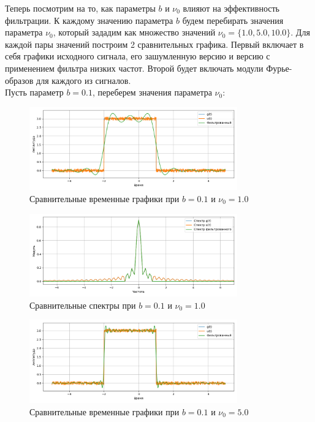 \documentclass[a4paper]{article}
\begin{document}
Теперь посмотрим на то, как параметры $b$ и $\nu_0$ влияют на эффективность фильтрации. К каждому значению параметра $b$ будем перебирать значения параметра $\nu_0$, который зададим как множество значений $\nu_0 = \{1.0, 5.0, 10.0\}$. Для каждой пары значений построим 2 сравнительных графика. Первый включает в себя графики исходного сигнала, его зашумленную версию и версию с применением фильтра низких частот. Второй будет включать модули Фурье-образов для каждого из сигналов.\\ [0.5em]
Пусть параметр $b=0.1$, переберем значения параметра $\nu_0$:
\begin{figure}[H]
    \centering
    \includegraphics[width=0.8\textwidth]{src/lpf/time_0.1_1.0.png}
    \caption{Сравнительные временные графики при $b=0.1$ и $\nu_0=1.0$}
\end{figure}
\begin{figure}[H]
    \centering
    \includegraphics[width=0.8\textwidth]{src/lpf/spec_0.1_1.0.png}
    \caption{Сравнительные спектры при $b=0.1$ и $\nu_0=1.0$}
\end{figure}
\begin{figure}[H]
    \centering
    \includegraphics[width=0.8\textwidth]{src/lpf/time_0.1_5.0.png}
    \caption{Сравнительные временные графики при $b=0.1$ и $\nu_0=5.0$}
\end{figure}
\end{document}
